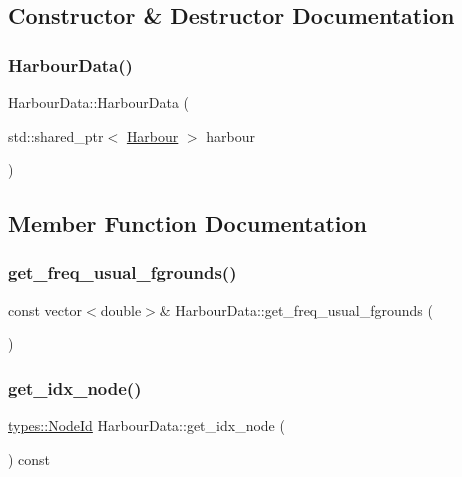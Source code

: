 \subsection{Constructor \& Destructor Documentation}
\mbox{\label{class_harbour_data_abdaa6f67f8c6969ecd89cb2d9ba32c96}} 
\subsubsection{\texorpdfstring{HarbourData()}{HarbourData()}}
{\footnotesize\ttfamily Harbour\+Data\+::\+Harbour\+Data (\begin{DoxyParamCaption}\item[{std\+::shared\+\_\+ptr$<$ \mbox{\hyperlink{class_harbour}{Harbour}} $>$}]{harbour }\end{DoxyParamCaption})\hspace{0.3cm}{\ttfamily [explicit]}}



\subsection{Member Function Documentation}
\mbox{\label{class_harbour_data_a073b5aadf1f11bfae38abd3464f707f8}} 
\subsubsection{\texorpdfstring{get\_freq\_usual\_fgrounds()}{get\_freq\_usual\_fgrounds()}}
{\footnotesize\ttfamily const vector$<$double$>$\& Harbour\+Data\+::get\+\_\+freq\+\_\+usual\+\_\+fgrounds (\begin{DoxyParamCaption}{ }\end{DoxyParamCaption})\hspace{0.3cm}{\ttfamily [inline]}}

\mbox{\label{class_harbour_data_a73b0b5eaaf08545f9905723f5078de62}} 
\subsubsection{\texorpdfstring{get\_idx\_node()}{get\_idx\_node()}}
{\footnotesize\ttfamily \mbox{\hyperlink{classtypes_1_1_node_id}{types\+::\+Node\+Id}} Harbour\+Data\+::get\+\_\+idx\+\_\+node (\begin{DoxyParamCaption}{ }\end{DoxyParamCaption}) const\hspace{0.3cm}{\ttfamily [inline]}}

